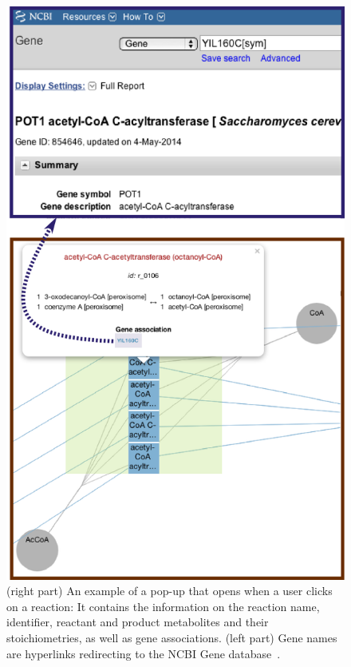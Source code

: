 \documentclass{bmcart}
\begin{document}
\begin{backmatter}
\begin{figure}[h!]
\includegraphics[scale=0.54]{figure3.png}
  \caption{
  \label{pop_up}
      (right part) An example of a pop-up that opens when a user clicks on a reaction: It contains the information on the reaction name, identifier, reactant and product metabolites and their stoichiometries, as well as gene associations. (left part) Gene names are hyperlinks redirecting to the NCBI Gene database~\cite{NCBI}.}
      \end{figure}
      

\end{backmatter}
\end{document}

